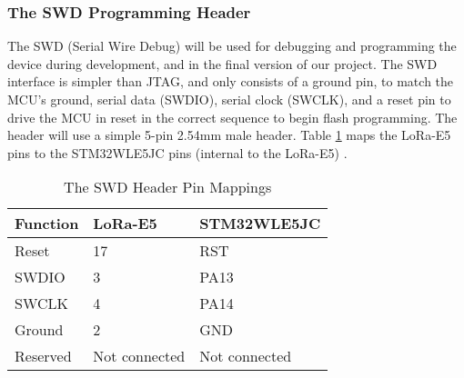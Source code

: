 \subsubsection{The SWD Programming Header}
The SWD (Serial Wire Debug) will be used for debugging and programming the device during
development, and in the final version of our project. The SWD interface is simpler than JTAG, and
only consists of a ground pin, to match the MCU's ground, serial data (SWDIO), serial clock
(SWCLK), and a reset pin to drive the MCU in reset in the correct sequence to begin flash
programming. The header will use a simple 5-pin 2.54mm male header. Table \ref{tab:swd-header} maps
the LoRa-E5 pins to the STM32WLE5JC pins (internal to the LoRa-E5) \cite{ds-stm32wle5j8}.

\begin{table}[H] 
  \footnotesize  
  \caption{The SWD Header Pin Mappings \cite{ds-stm32wle5j8}\cite{ds-lora-e5}}
  \begin{tabularx}{\linewidth}{| X | X | X |}
    \hline
    Function & LoRa-E5 & STM32WLE5JC 
    \\\hline\hline

    Reset
    & 17
    & RST
    \\\hline

    SWDIO
    & 3
    & PA13
    \\\hline

    SWCLK
    & 4
    & PA14
    \\\hline

    Ground
    & 2
    & GND
    \\\hline

    Reserved
    & Not connected
    & Not connected
    \\\hline

  \end{tabularx}
  \label{tab:swd-header}
\end{table}


